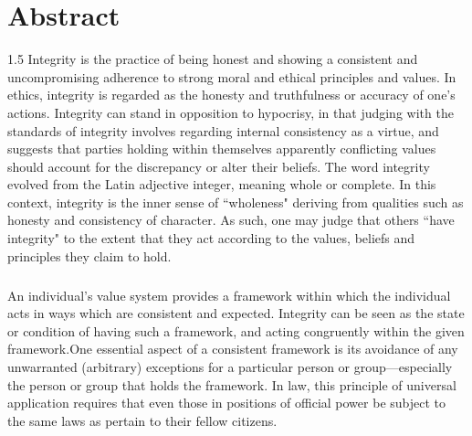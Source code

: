 \chapter*{Abstract}
\begin{spacing}{1.5}
Integrity is the practice of being honest and showing a consistent and uncompromising adherence to strong moral and ethical principles and values. In ethics, integrity is regarded as the honesty and truthfulness or accuracy of one's actions. Integrity can stand in opposition to hypocrisy, in that judging with the standards of integrity involves regarding internal consistency as a virtue, and suggests that parties holding within themselves apparently conflicting values should account for the discrepancy or alter their beliefs. The word integrity evolved from the Latin adjective integer, meaning whole or complete. In this context, integrity is the inner sense of ``wholeness" deriving from qualities such as honesty and consistency of character. As such, one may judge that others ``have integrity" to the extent that they act according to the values, beliefs and principles they claim to hold.
\paragraph{}
An individual's value system provides a framework within which the individual acts in ways which are consistent and expected. Integrity can be seen as the state or condition of having such a framework, and acting congruently within the given framework.One essential aspect of a consistent framework is its avoidance of any unwarranted (arbitrary) exceptions for a particular person or group—especially the person or group that holds the framework. In law, this principle of universal application requires that even those in positions of official power be subject to the same laws as pertain to their fellow citizens.
\end{spacing}

